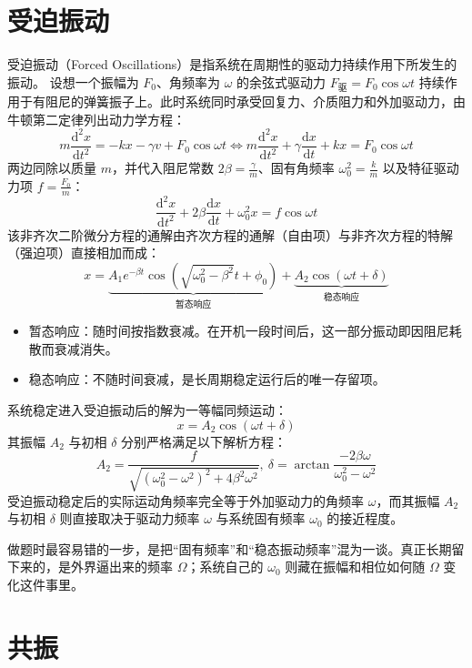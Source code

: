 \documentclass[lang=cn,11pt]{elegantbook}
\begin{document}
\section{受迫振动}

\begin{definition}[受迫振动]
受迫振动（Forced Oscillations）是指系统在周期性的驱动力持续作用下所发生的振动。
设想一个振幅为 $F_0$、角频率为 $\omega$ 的余弦式驱动力 $F_{\text{驱}} = F_0 \cos \omega t$ 持续作用于有阻尼的弹簧振子上。此时系统同时承受回复力、介质阻力和外加驱动力，由牛顿第二定律列出动力学方程：$$m \frac{\mathrm{d}^2x}{\mathrm{d}t^2} = -kx - \gamma v + F_0 \cos \omega t\Longleftrightarrow m \frac{\mathrm{d}^2x}{\mathrm{d}t^2} + \gamma \frac{\mathrm{d}x}{\mathrm{d}t} + kx = F_0 \cos \omega t$$
两边同除以质量 $m$，并代入阻尼常数 $2\beta = \frac{\gamma}{m}$、固有角频率 $\omega_0^2 = \frac{k}{m}$ 以及特征驱动力项 $f = \frac{F_0}{m}$：$$\boxed{\frac{\mathrm{d}^2x}{\mathrm{d}t^2} + 2\beta \frac{\mathrm{d}x}{\mathrm{d}t} + \omega_0^2 x = f \cos \omega t}$$该非齐次二阶微分方程的通解由齐次方程的通解（自由项）与非齐次方程的特解（强迫项）直接相加而成：$$x = \underbrace{A_1 e^{-\beta t} \cos\left( \sqrt{\omega_0^2 - \beta^2} t + \phi_0 \right)}_{\text{暂态响应}} + \underbrace{A_2 \cos(\omega t + \delta)}_{\text{稳态响应}}$$
\begin{itemize}
\item 暂态响应：随时间按指数衰减。在开机一段时间后，这一部分振动即因阻尼耗散而衰减消失。
\item 稳态响应：不随时间衰减，是长周期稳定运行后的唯一存留项。
\end{itemize}
系统稳定进入受迫振动后的解为一等幅同频运动：$$x = A_2 \cos(\omega t + \delta)$$其振幅 $A_2$ 与初相 $\delta$ 分别严格满足以下解析方程：$$\boxed{A_2 = \frac{f}{\sqrt{(\omega_0^2 - \omega^2)^2 + 4\beta^2 \omega^2}}},~\boxed{\delta = \arctan \frac{-2\beta \omega}{\omega_0^2 - \omega^2}}$$受迫振动稳定后的实际运动角频率完全等于外加驱动力的角频率 $\omega$，而其振幅 $A_2$ 与初相 $\delta$ 则直接取决于驱动力频率 $\omega$ 与系统固有频率 $\omega_0$ 的接近程度。
\end{definition}
\begin{remark}
做题时最容易错的一步，是把“固有频率”和“稳态振动频率”混为一谈。真正长期留下来的，是外界逼出来的频率 \(\Omega\)；系统自己的 \(\omega_0\) 则藏在振幅和相位如何随 \(\Omega\) 变化这件事里。
\end{remark}

\section{共振}
\end{document}
